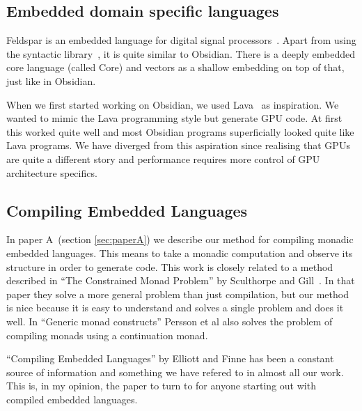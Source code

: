 \documentclass[a4paper]{book}
\begin{document}
\subsection{Embedded domain specific languages} 

Feldspar is an embedded language for digital signal processors~\citet{FELDSPAR}. Apart 
from using the syntactic library~\citet{SyntacticICFP12}, it is quite similar to Obsidian. 
There is a deeply embedded core language (called Core) and vectors as a shallow embedding 
on top of that, just like in Obsidian.

When we first started working on Obsidian, we used Lava~\citet{LavaICFP} as inspiration. 
We wanted to mimic the Lava programming style but generate GPU code. At first this worked quite 
well and most Obsidian programs superficially looked quite like Lava programs. We have diverged 
from this aspiration since realising that GPUs are quite a different story and performance 
requires more control of GPU architecture specifics. 

\subsection{Compiling Embedded Languages}

In paper A~(section \ref{sec:paperA}) we describe our method for compiling monadic embedded 
languages. 
This means to take a monadic computation and observe its structure in order to generate
code. This work is closely related to a method described in ``The Constrained Monad Problem''
by Sculthorpe and Gill~\citet{sculthorpe2013constrained}. In that paper they solve a more 
general problem than just compilation, but our method is nice because it is easy to understand 
and solves a single problem and does it well. In ``Generic monad constructs'' Persson et al 
also solves the problem of compiling monads using a continuation monad. 

``Compiling Embedded Languages'' by Elliott and Finne has been a constant source of information 
and something we have refered to in almost all our work. This is, in my opinion, the paper to turn 
to for anyone starting out with compiled embedded languages. 
\end{document}
